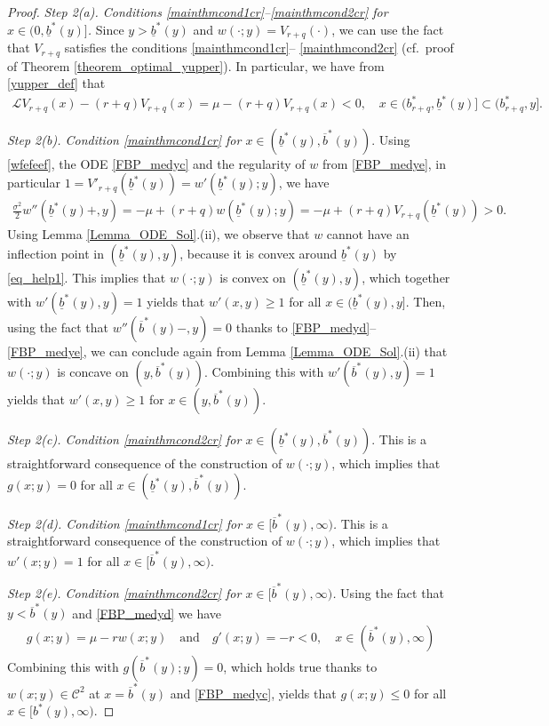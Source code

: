 \documentclass[11pt]{article} %
\newcommand{\ubar}[1]{\underaccent{\bar}{#1}}
\numberwithin{komcounter}{section}
\renewcommand{\ubar}{\underline}
\renewcommand{\bar}{\overline}
\numberwithin{equation}{section}
\numberwithin{theorem}{section}
\begin{document}
\begin{proof}
\vspace{1mm}
{\it Step 2(a). Conditions \eqref{mainthmcond1cr}--\eqref{mainthmcond2cr} for $x\in (0,\ubar{b}^*(y)]$.} 
Since $y>\ubar{b}^*(y)$ and $w(\cdot;y) = V_{r+q}(\cdot)$, we can use the fact that $V_{r+q}$ satisfies the conditions \eqref{mainthmcond1cr}-- \eqref{mainthmcond2cr} (cf.~proof of Theorem \ref{theorem_optimal_yupper}). 
In particular, we have from \eqref{yupper_def} that
\begin{align} \label{wfefeef}
\mathcal{L}V_{r+q}(x) - (r+q) V_{r+q}(x) 
= \mu - (r+q) V_{r+q}(x)
< 0,  
\quad x \in (b^*_{r+q}, \ubar{b}^*(y)] \subset (b^*_{r+q}, y].
\end{align}

\vspace{1mm}
{\it Step 2(b). Condition \eqref{mainthmcond1cr} for $x\in (\ubar{b}^*(y),\bar{b}^*(y))$}. 
Using \eqref{wfefeef}, the ODE  \eqref{FBP_medyc} and the regularity of $w$ from \eqref{FBP_medye}, in particular $1 = V'_{r+q}(\ubar{b}^*(y)) = w'(\ubar{b}^*(y);y)$, we have 
\begin{align} \label{eq_help1}
\tfrac{\sigma^2}{2} w''(\ubar{b}^*(y)+,y) 
= - \mu + (r+q) w(\ubar{b}^*(y);y) 
= - \mu + (r+q) V_{r+q}(\ubar{b}^*(y)) > 0.
\end{align}
Using Lemma \ref{Lemma_ODE_Sol}.(ii), we observe that $w$ cannot have an inflection point in $(\ubar{b}^*(y),y)$, because it is convex around $\ubar{b}^*(y)$ by \eqref{eq_help1}. 
This implies that $w(\cdot;y)$ is convex on $(\ubar{b}^*(y),y)$, which together with $w'(\ubar{b}^*(y),y)=1$ yields that $w'(x,y)\geq 1$ for all $x\in (\ubar{b}^*(y),y]$. 
Then, using the fact that $w''(\bar{b}^*(y)-,y)=0$ thanks to \eqref{FBP_medyd}--\eqref{FBP_medye}, we can conclude again from Lemma \ref{Lemma_ODE_Sol}.(ii) that $w(\cdot;y)$ is concave on $(y,\bar{b}^*(y))$. 
Combining this with $w'(\bar{b}^*(y),y)=1$ yields that $w'(x,y)\geq 1$ for $x \in (y,\bar{b}^*(y))$. 

\vspace{1mm}
{\it Step 2(c). Condition \eqref{mainthmcond2cr} for $x\in (\ubar{b}^*(y),\bar{b}^*(y))$}. 
This is a straightforward consequence of the construction of $w(\cdot;y)$, which implies that $g(x;y)=0$ for all $x \in (\ubar{b}^*(y),\bar{b}^*(y))$.


\vspace{1mm}
{\it Step 2(d). Condition \eqref{mainthmcond1cr} for $x\in [\bar{b}^*(y),\infty)$.} 
This is a straightforward consequence of the construction of $w(\cdot;y)$, which implies that $w'(x;y)=1$ for all $x \in [\bar{b}^*(y),\infty)$.

\vspace{1mm}
{\it Step 2(e). Condition \eqref{mainthmcond2cr} for $x\in [\bar{b}^*(y),\infty)$.} 
Using the fact that $y < \bar{b}^*(y)$ and \eqref{FBP_medyd} we have  
\begin{align*}
g(x;y) = \mu - r w(x;y) 
\quad \text{and} \quad
g'(x;y) = - r < 0, 
\quad x\in (\bar{b}^*(y),\infty)
\end{align*}
Combining this with $g(\bar{b}^*(y);y)=0$, which holds true thanks to $w(x;y) \in \mathcal{C}^2$ at $x=\bar{b}^*(y)$ and \eqref{FBP_medyc}, 
yields that $g(x;y) \leq 0$ for all $x\in [b^*(y),\infty)$.

\end{proof}
\end{document}
